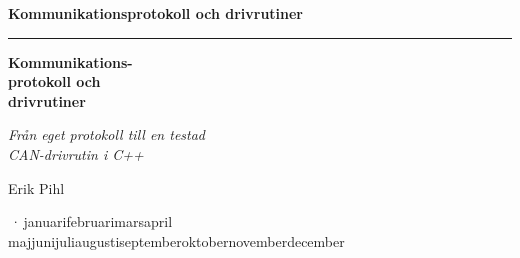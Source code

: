 %
\providecommand{\bookversion}{}
\newcommand{\bookdate}{\number\day\space\ifcase\month\or januari\or februari\or mars\or april\or
  maj\or juni\or juli\or augusti\or september\or oktober\or november\or december\fi\space
  \number\year}
\newcommand{\bookedition}{\ifx\bookversion\empty\else\bookversion\,·\,\fi\bookdate}

\thispagestyle{empty}
\vspace*{2.2in}
\begin{flushright}
  {\Large\bfseries Kommunikationsprotokoll och drivrutiner}
\end{flushright}
\cleardoublepage

\thispagestyle{empty}
\vspace*{1.1in}
\begin{flushleft}
  {\color{accent}\rule{0.9in}{2.5pt}}\par\vspace{1.4ex}
  {\fontsize{30}{36}\selectfont\bfseries Kommunikations-\\[0.15ex] protokoll och\\[0.15ex]
   drivrutiner\par}
  \vspace{2.2ex}
  {\Large\itshape Från eget protokoll till en testad\\CAN-drivrutin i C++\par}
  \vspace{1.0in}
  {\large Erik Pihl\par}
  \vfill
  {\small\color{muted} \bookedition\par}
\end{flushleft}
\newpage

